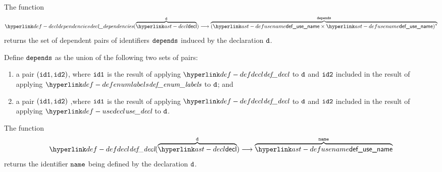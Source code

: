 \FormallyParagraph
\begin{mathpar}
\end{mathpar}

\hypertarget{def-decldependencies}{}
The function
\[
\decldependencies(\overname{\decl}{\vd}) \aslto \overname{(\defusename\times\defusename)^*}{\dependencies}
\]
returns the set of dependent pairs of identifiers $\dependencies$ induced by the declaration $\vd$.

\ProseParagraph
Define $\dependencies$ as the union of the following two sets of pairs:
\begin{enumerate}
  \item a pair $(\idone, \idtwo)$, where $\idone$ is the result of applying $\defdecl$ to $\vd$
        and $\idtwo$ included in the result of applying $\defenumlabels$ to $\vd$; and
  \item a pair $(\idone, \idtwo)$ ,where $\idone$ is the result of applying $\defdecl$ to $\vd$
        and $\idtwo$ included in the result of applying $\usedecl$ to $\vd$.
\end{enumerate}

\FormallyParagraph
\begin{mathpar}
\end{mathpar}

\hypertarget{def-defdecl}{}
The function
\[
\defdecl(\overname{\decl}{\vd}) \aslto \overname{\defusename}{\name}
\]
returns the identifier $\name$ being defined by the declaration $\vd$.

